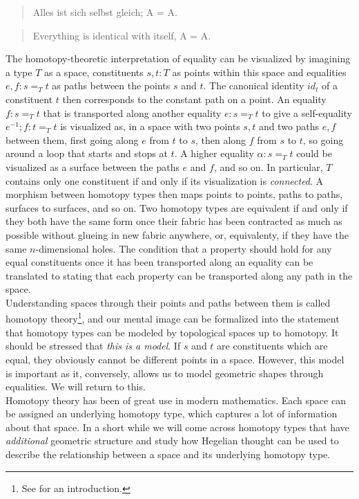 \documentclass{article}
\begin{document}
\begin{quote}
    Alles ist sich selbst gleich; A = A.
\end{quote}

\begin{quote}
    Everything is identical with itself, A = A.
\end{quote}

The homotopy-theoretic interpretation of equality can be visualized by imagining a type $T$ as a space, constituents $s,t:T$ as points within this space and equalities $e,f:s=_T t$ as paths between the points $s$ and $t$. The canonical identity $id_t$ of a constituent $t$ then corresponds to the constant path on a point. An equality $f:s =_T t$  that is transported along another equality $e:s =_T t$ to give a self-equality $e^{-1};f:t=_T t$ is visualized as, in a space with two points $s,t$ and two paths $e,f$ between them, first going along $e$ from $t$ to $s$, then along $f$ from $s$ to $t$, so going around a loop that starts and stops at $t$. A higher equality $\alpha:s=_T t$ could be visualized as a surface between the paths $e$ and $f$, and so on. In particular, $T$ contains only one constituent if and only if its visualization is \emph{connected}. A morphism between homotopy types then maps points to points, paths to paths, surfaces to surfaces, and so on. Two homotopy types are equivalent if and only if they both have the same form once their fabric has been contracted as much as possible without glueing in new fabric anywhere, or, equivalenty, if they have the same $n$-dimensional holes. The condition that a property should hold for any equal constituents once it has been transported along an equality can be translated to stating that each property can be transported along any path in the space. \\

Understanding spaces through their points and paths between them is called homotopy theory\footnote{See \cite{Htt} for an introduction.}, and our mental image can be formalized into the statement that homotopy types can be modeled by topological spaces up to homotopy. It should be stressed that \emph{this is a model}. If $s$ and $t$ are constituents which are equal, they obviously cannot be different points in a space. However, this model is important as it, conversely, allows us to model geometric shapes through equalities. We will return to this. \\

Homotopy theory has been of great use in modern mathematics. Each space can be assigned an underlying homotopy type, which captures a lot of information about that space. In a short while we will come across homotopy types that have \emph{additional} geometric structure and study how Hegelian thought can be used to describe the relationship between a space and its underlying homotopy type. \\
\end{document}
